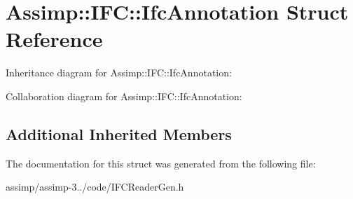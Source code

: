 \hypertarget{struct_assimp_1_1_i_f_c_1_1_ifc_annotation}{\section{Assimp\+:\+:I\+F\+C\+:\+:Ifc\+Annotation Struct Reference}
\label{struct_assimp_1_1_i_f_c_1_1_ifc_annotation}
}


Inheritance diagram for Assimp\+:\+:I\+F\+C\+:\+:Ifc\+Annotation\+:


Collaboration diagram for Assimp\+:\+:I\+F\+C\+:\+:Ifc\+Annotation\+:
\subsection*{Additional Inherited Members}


The documentation for this struct was generated from the following file\+:\begin{DoxyCompactItemize}
\item 
assimp/assimp-\/3../code/I\+F\+C\+Reader\+Gen.\+h\end{DoxyCompactItemize}
